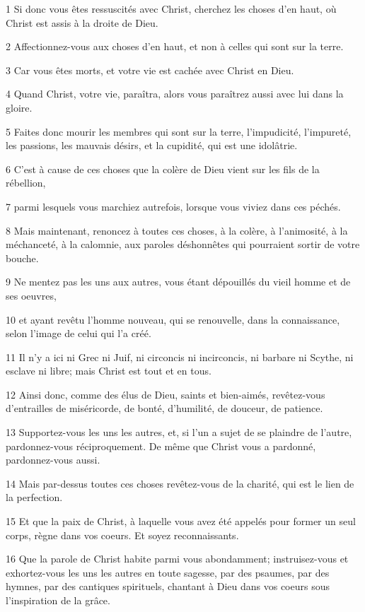 \par 1 Si donc vous êtes ressuscités avec Christ, cherchez les choses d'en haut, où Christ est assis à la droite de Dieu.
\par 2 Affectionnez-vous aux choses d'en haut, et non à celles qui sont sur la terre.
\par 3 Car vous êtes morts, et votre vie est cachée avec Christ en Dieu.
\par 4 Quand Christ, votre vie, paraîtra, alors vous paraîtrez aussi avec lui dans la gloire.
\par 5 Faites donc mourir les membres qui sont sur la terre, l'impudicité, l'impureté, les passions, les mauvais désirs, et la cupidité, qui est une idolâtrie.
\par 6 C'est à cause de ces choses que la colère de Dieu vient sur les fils de la rébellion,
\par 7 parmi lesquels vous marchiez autrefois, lorsque vous viviez dans ces péchés.
\par 8 Mais maintenant, renoncez à toutes ces choses, à la colère, à l'animosité, à la méchanceté, à la calomnie, aux paroles déshonnêtes qui pourraient sortir de votre bouche.
\par 9 Ne mentez pas les uns aux autres, vous étant dépouillés du vieil homme et de ses oeuvres,
\par 10 et ayant revêtu l'homme nouveau, qui se renouvelle, dans la connaissance, selon l'image de celui qui l'a créé.
\par 11 Il n'y a ici ni Grec ni Juif, ni circoncis ni incirconcis, ni barbare ni Scythe, ni esclave ni libre; mais Christ est tout et en tous.
\par 12 Ainsi donc, comme des élus de Dieu, saints et bien-aimés, revêtez-vous d'entrailles de miséricorde, de bonté, d'humilité, de douceur, de patience.
\par 13 Supportez-vous les uns les autres, et, si l'un a sujet de se plaindre de l'autre, pardonnez-vous réciproquement. De même que Christ vous a pardonné, pardonnez-vous aussi.
\par 14 Mais par-dessus toutes ces choses revêtez-vous de la charité, qui est le lien de la perfection.
\par 15 Et que la paix de Christ, à laquelle vous avez été appelés pour former un seul corps, règne dans vos coeurs. Et soyez reconnaissants.
\par 16 Que la parole de Christ habite parmi vous abondamment; instruisez-vous et exhortez-vous les uns les autres en toute sagesse, par des psaumes, par des hymnes, par des cantiques spirituels, chantant à Dieu dans vos coeurs sous l'inspiration de la grâce.
